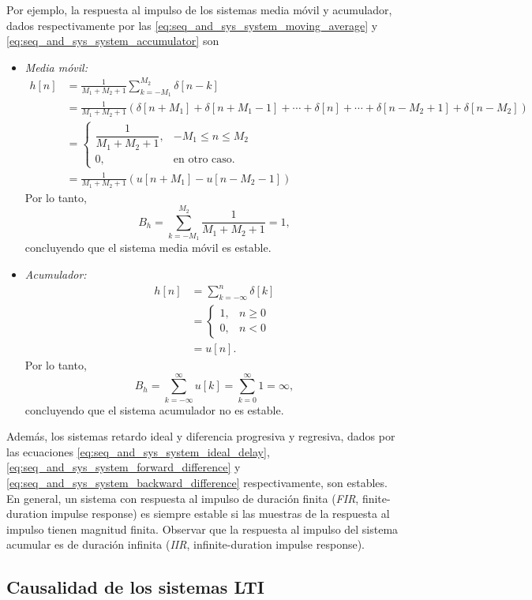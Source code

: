 \documentclass[a4paper]{report}
\begin{document}
Por ejemplo, la respuesta al impulso de los sistemas media móvil y acumulador, dados respectivamente por las \ref{eq:seq_and_sys_system_moving_average} y \ref{eq:seq_and_sys_system_accumulator} son
\begin{itemize}
 \item \emph{Media móvil:}
 \begin{align}
  h[n]&=\frac{1}{M_1+M_2+1}\sum_{k=-M_1}^{M_2}\delta[n-k]\nonumber\\
   &=\frac{1}{M_1+M_2+1}\left(\delta[n+M_1]+\delta[n+M_1-1]+\cdots+\delta[n]+\cdots+\delta[n-M_2+1]+\delta[n-M_2]\right)\nonumber\\
   &=\left\{
   \begin{array}{ll}
    \dfrac{1}{M_1+M_2+1}, & -M_1\leq n\leq M_2\\
    0, &\textrm{en otro caso}.
   \end{array}
   \right.\nonumber\\
   &=\frac{1}{M_1+M_2+1}(u[n+M_1]-u[n-M_2-1])\label{eq:seq_and_sys_system_moving_average_impulse}
 \end{align}
 Por lo tanto,
 \[
  B_h=\sum_{k=-M_1}^{M_2}\frac{1}{M_1+M_2+1}=1,
 \]
 concluyendo que el sistema media móvil es estable.
 \item \emph{Acumulador:}
 \begin{align*}
  h[n]&=\sum_{k=-\infty}^n\delta[k]\\
   &=\left\{
   \begin{array}{ll}
    1, & n\geq0\\
    0, & n<0
   \end{array}
   \right.\\
   &=u[n].
 \end{align*}
 Por lo tanto,
 \[
  B_h=\sum_{k=-\infty}^\infty u[k]=\sum_{k=0}^\infty 1=\infty,
 \]
 concluyendo que el sistema acumulador no es estable.
\end{itemize}
Además, los sistemas retardo ideal y diferencia progresiva y regresiva, dados por las ecuaciones \ref{eq:seq_and_sys_system_ideal_delay}, \ref{eq:seq_and_sys_system_forward_difference} y \ref{eq:seq_and_sys_system_backward_difference} respectivamente, son estables. En general, un sistema con respuesta al impulso de duración finita (\emph{FIR}, finite-duration impulse response) es siempre estable si las muestras de la respuesta al impulso tienen magnitud finita. Observar que la respuesta al impulso del sistema acumular es de duración infinita (\emph{IIR}, infinite-duration impulse response).

\subsection{Causalidad de los sistemas LTI} 
 
\end{document}

